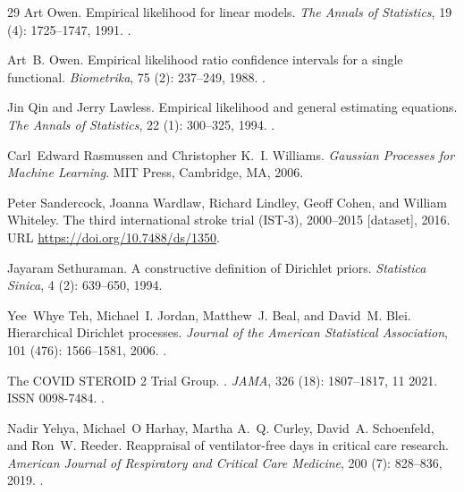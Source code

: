 \documentclass[11pt]{article}
\begin{document}
\begin{thebibliography}{29}
Art Owen.
\newblock Empirical likelihood for linear models.
\newblock \emph{The Annals of Statistics}, 19 (4):
  1725--1747, 1991.
\newblock {}.

Art~B. Owen.
\newblock Empirical likelihood ratio confidence intervals for a single
  functional.
\newblock \emph{Biometrika}, 75 (2): 237--249, 1988.
\newblock {}.

Jin Qin and Jerry Lawless.
\newblock Empirical likelihood and general estimating equations.
\newblock \emph{The Annals of Statistics}, 22 (1): 300--325,
  1994.
\newblock {}.

Carl~Edward Rasmussen and Christopher K.~I. Williams.
\newblock \emph{Gaussian Processes for Machine Learning}.
\newblock MIT Press, Cambridge, MA, 2006.

Peter Sandercock, Joanna Wardlaw, Richard Lindley, Geoff Cohen, and William
  Whiteley.
\newblock The third international stroke trial ({IST}-3), 2000--2015 [dataset],
  2016.
\newblock URL \url{https://doi.org/10.7488/ds/1350}.

Jayaram Sethuraman.
\newblock A constructive definition of {D}irichlet priors.
\newblock \emph{Statistica Sinica}, 4 (2): 639--650, 1994.

Yee~Whye Teh, Michael~I. Jordan, Matthew~J. Beal, and David~M. Blei.
\newblock Hierarchical {D}irichlet processes.
\newblock \emph{Journal of the American Statistical Association}, 101
  (476): 1566--1581, 2006.
\newblock {}.

{The COVID STEROID 2 Trial Group}.
.
\newblock \emph{JAMA}, 326 (18): 1807--1817, 11 2021.
\newblock ISSN 0098-7484.
\newblock {}.

Nadir Yehya, Michael~O Harhay, Martha A.~Q. Curley, David~A. Schoenfeld, and
  Ron~W. Reeder.
\newblock Reappraisal of ventilator-free days in critical care research.
\newblock \emph{American Journal of Respiratory and Critical Care Medicine},
  200 (7): 828--836, 2019.
\newblock {}.

\end{thebibliography}
\end{document}
